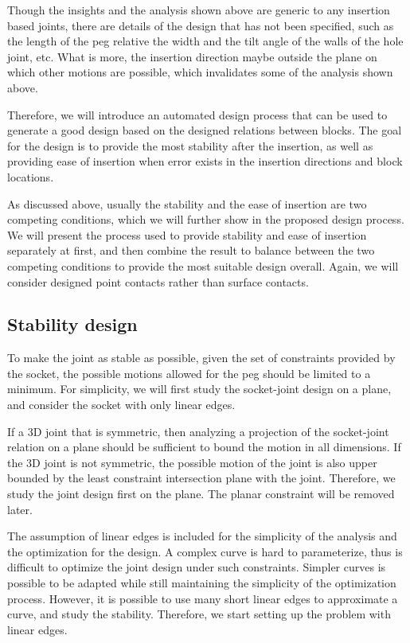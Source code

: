 Though the insights and the analysis shown above are generic to any insertion based joints, there are details of the design that has not been specified, such as the length of the peg relative the width and the tilt angle of the walls of the hole joint, etc. What is more, the insertion direction maybe outside the plane on which other motions are possible, which invalidates some of the analysis shown above.

Therefore, we will introduce an automated design process that can be used to generate a good design based on the designed relations between blocks. The goal for the design is to provide the most stability after the insertion, as well as providing ease of insertion when error exists in the insertion directions and block locations. 

As discussed above, usually the stability and the ease of insertion are two competing conditions, which we will further show in the proposed design process. We will present the process used to provide stability and ease of insertion separately at first, and then combine the result to balance between the two competing conditions to provide the most suitable design overall. Again, we will consider designed point contacts rather than surface contacts. 

\subsection{Stability design}


To make the joint as stable as possible, given the set of constraints provided by the socket, the possible motions allowed for the peg should be limited to a minimum. For simplicity, we will first study the socket-joint design on a plane, and consider the socket with only linear edges. 

If a 3D joint that is symmetric, then analyzing a projection of the socket-joint relation on a plane should be sufficient to bound the motion in all dimensions. If the 3D joint is not symmetric, the possible motion of the joint is also upper bounded by the least constraint intersection plane with the joint. Therefore, we study the joint design first on the plane. The planar constraint will be removed later. 

The assumption of linear edges is included for the simplicity of the analysis and the optimization for the design. A complex curve is hard to parameterize, thus is difficult to optimize the joint design under such constraints. Simpler curves is possible to be adapted while still maintaining the simplicity of the optimization process. However, it is possible to use many short linear edges to approximate a curve, and study the stability. Therefore, we start setting up the problem with linear edges. 


